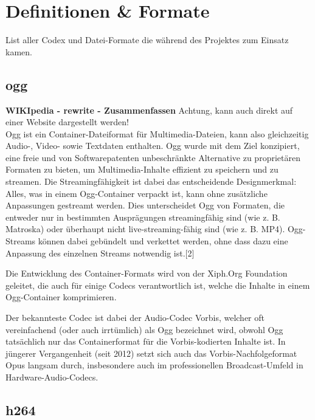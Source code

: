 \newpage
\section{Definitionen \& Formate}
List aller Codex und Datei-Formate die während des Projektes zum Einsatz kamen.

\subsection{ogg}

\textbf{WIKIpedia - rewrite - Zusammenfassen}
Achtung, kann auch direkt auf einer Website dargestellt werden!\\

Ogg ist ein Container-Dateiformat für Multimedia-Dateien, kann also gleichzeitig Audio-, Video- sowie Textdaten enthalten. Ogg wurde mit dem Ziel konzipiert, eine freie und von Softwarepatenten unbeschränkte Alternative zu proprietären Formaten zu bieten, um Multimedia-Inhalte effizient zu speichern und zu streamen. Die Streamingfähigkeit ist dabei das entscheidende Designmerkmal: Alles, was in einem Ogg-Container verpackt ist, kann ohne zusätzliche Anpassungen gestreamt werden. Dies unterscheidet Ogg von Formaten, die entweder nur in bestimmten Ausprägungen streamingfähig sind (wie z. B. Matroska) oder überhaupt nicht live-streaming-fähig sind (wie z. B. MP4). Ogg-Streams können dabei gebündelt und verkettet werden, ohne dass dazu eine Anpassung des einzelnen Streams notwendig ist.[2]

Die Entwicklung des Container-Formats wird von der Xiph.Org Foundation geleitet, die auch für einige Codecs verantwortlich ist, welche die Inhalte in einem Ogg-Container komprimieren.

Der bekannteste Codec ist dabei der Audio-Codec Vorbis, welcher oft vereinfachend (oder auch irrtümlich) als Ogg bezeichnet wird, obwohl Ogg tatsächlich nur das Containerformat für die Vorbis-kodierten Inhalte ist. In jüngerer Vergangenheit (seit 2012) setzt sich auch das Vorbis-Nachfolgeformat Opus langsam durch, insbesondere auch im professionellen Broadcast-Umfeld in Hardware-Audio-Codecs. 


\subsection{h264}

